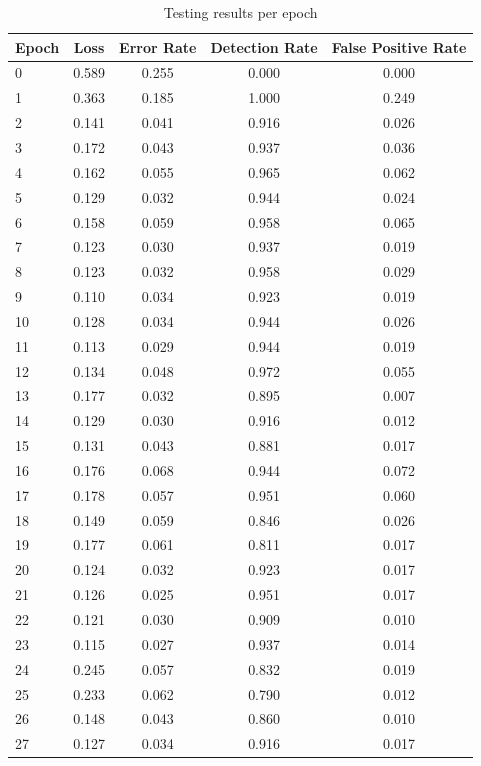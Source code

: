 \documentclass[12pt, a4paper]{article}
\begin{document}
\begin{table}[H]
	\centering
	\begin{tabular}{|l|cccc|}
		\toprule
		Epoch & Loss & Error Rate & Detection Rate & False Positive Rate\\
		\midrule
		0 & 0.589 & 0.255 & 0.000 & 0.000\\ \hline
		1 & 0.363 & 0.185 & 1.000 & 0.249\\ \hline
		2 & 0.141 & 0.041 & 0.916 & 0.026\\ \hline
		3 & 0.172 & 0.043 & 0.937 & 0.036\\ \hline
		4 & 0.162 & 0.055 & 0.965 & 0.062\\ \hline
		5 & 0.129 & 0.032 & 0.944 & 0.024\\ \hline
		6 & 0.158 & 0.059 & 0.958 & 0.065\\ \hline
		7 & 0.123 & 0.030 & 0.937 & 0.019\\ \hline
		8 & 0.123 & 0.032 & 0.958 & 0.029\\ \hline
		9 & 0.110 & 0.034 & 0.923 & 0.019\\ \hline
		10 & 0.128 & 0.034 & 0.944 & 0.026\\ \hline
		11 & 0.113 & 0.029 & 0.944 & 0.019\\ \hline
		12 & 0.134 & 0.048 & 0.972 & 0.055\\ \hline
		13 & 0.177 & 0.032 & 0.895 & 0.007\\ \hline
		14 & 0.129 & 0.030 & 0.916 & 0.012\\ \hline
		15 & 0.131 & 0.043 & 0.881 & 0.017\\ \hline
		16 & 0.176 & 0.068 & 0.944 & 0.072\\ \hline
		17 & 0.178 & 0.057 & 0.951 & 0.060\\ \hline
		18 & 0.149 & 0.059 & 0.846 & 0.026\\ \hline
		19 & 0.177 & 0.061 & 0.811 & 0.017\\ \hline
		20 & 0.124 & 0.032 & 0.923 & 0.017\\ \hline
		21 & 0.126 & 0.025 & 0.951 & 0.017\\ \hline
		22 & 0.121 & 0.030 & 0.909 & 0.010\\ \hline
		23 & 0.115 & 0.027 & 0.937 & 0.014\\ \hline
		24 & 0.245 & 0.057 & 0.832 & 0.019\\ \hline
		25 & 0.233 & 0.062 & 0.790 & 0.012\\ \hline
		26 & 0.148 & 0.043 & 0.860 & 0.010\\ \hline
		27 & 0.127 & 0.034 & 0.916 & 0.017\\ \hline
	\end{tabular}
\caption{Testing results per epoch}\label{epocst}
\end{table}
\end{document}
